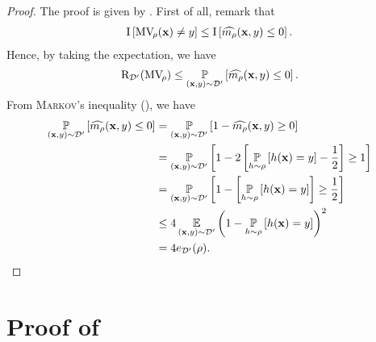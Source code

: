 \begin{noaddcontents}
\theoremjoint*
\begin{proof}
    The proof is given by \citet{MasegosaLorenzenIgelSeldin2020}.
First of all, remark that 
\begin{align*}
    \indic\LB \MVQ(\x) \ne \y \RB \le \indic\LB \OmMaQ(\x,\y)\le 0 \RB.
\end{align*}
Hence, by taking the expectation, we have 
\begin{align*}
    \Risk_{\Dp}(\MVQ) \le \PP_{(\x,\y)\sim\Dp}\LB \OmMaQ(\x,\y)\le 0 \RB.
\end{align*}
From \textsc{Markov}'s inequality (), we have 
\begin{align*}
    \PP_{(\x,\y)\sim\Dp}\LB \OmMaQ(\x,\y)\le 0 \RB &= \PP_{(\x,\y)\sim\Dp}\LB 1-\OmMaQ(\x,\y)\ge 0 \RB\\
    &= \PP_{(\x,\y)\sim\Dp}\LB 1-2\LB\PP_{\h\sim\Q}\LB \h(\x)=\y \RB - \frac{1}{2}\RB\ge 1 \RB\\
    &= \PP_{(\x,\y)\sim\Dp}\LB 1-\LB\PP_{\h\sim\Q}\LB \h(\x)=\y \RB\RB\ge \frac{1}{2} \RB\\
    &\le 4\EE_{(\x,\y)\sim\Dp}\LP1-\PP_{\h\sim\Q}\LB \h(\x)=\y \RB\RP^2\\
    &= 4e_{\Dp}(\Q).
\end{align*}
\end{proof}

\section{Proof of }
\label{ap:pac-bayes:sec:proof-cbound}


\end{noaddcontents}
